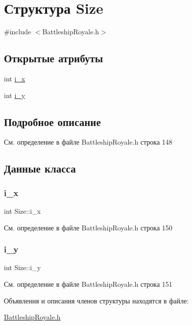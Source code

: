 \hypertarget{struct_size}{}\section{Структура Size}
\label{struct_size}


{\ttfamily \#include $<$Battleship\+Royale.\+h$>$}

\subsection*{Открытые атрибуты}
\begin{DoxyCompactItemize}
\item 
int \mbox{\hyperlink{struct_size_a59a3e96c2fc93d7fb98d8f4b0b0fd2e0}{i\+\_\+x}}
\item 
int \mbox{\hyperlink{struct_size_a97bc50af533709613a47adc977d26f03}{i\+\_\+y}}
\end{DoxyCompactItemize}


\subsection{Подробное описание}


См. определение в файле Battleship\+Royale.\+h строка 148



\subsection{Данные класса}
\mbox{\label{struct_size_a59a3e96c2fc93d7fb98d8f4b0b0fd2e0}} 
\subsubsection{\texorpdfstring{i\_x}{i\_x}}
{\footnotesize\ttfamily int Size\+::i\+\_\+x}



См. определение в файле Battleship\+Royale.\+h строка 150

\mbox{\label{struct_size_a97bc50af533709613a47adc977d26f03}} 
\subsubsection{\texorpdfstring{i\_y}{i\_y}}
{\footnotesize\ttfamily int Size\+::i\+\_\+y}



См. определение в файле Battleship\+Royale.\+h строка 151



Объявления и описания членов структуры находятся в файле\+:\begin{DoxyCompactItemize}
\item 
\mbox{\hyperlink{_battleship_royale_8h}{Battleship\+Royale.\+h}}\end{DoxyCompactItemize}
